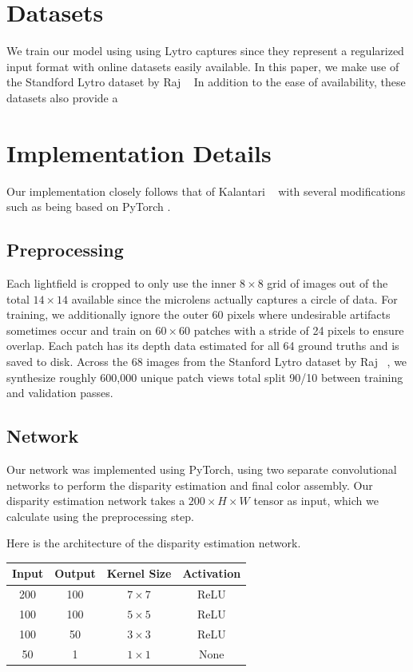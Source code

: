\documentclass[10pt,twocolumn,letterpaper]{article}
\begin{document}
\section{Datasets}

We train our model using using Lytro captures since they represent a regularized input format with
online datasets easily available. In this paper, we make use of the Standford Lytro dataset by Raj \etal~\cite{StanfordLytro}
In addition to the ease of availability, these datasets also provide a 

\section{Implementation Details}

Our implementation closely follows that of Kalantari \etal~\cite{LearningViewSynthesis} with several modifications such
as being based on PyTorch \cite{PyTorch}.

\subsection{Preprocessing}

Each lightfield is cropped to only use the inner $8 \times 8$ grid of images out of the total $14 \times 14$ available
since the microlens actually captures a circle of data. For training, we additionally ignore the outer 60 pixels where
undesirable artifacts sometimes occur and train on $60\times60$ patches with a stride of 24 pixels to ensure overlap.
Each patch has its depth data estimated for all 64 ground truths and is saved to disk. Across the 68 images from the
Stanford Lytro dataset by Raj \etal~\cite{StanfordLytro}, we synthesize roughly 600,000 unique patch views total split
90/10 between training and validation passes.

\subsection{Network}

Our network was implemented using PyTorch, using two separate convolutional networks to perform the
disparity estimation and final color assembly. Our disparity estimation network takes a 
$200 \times H \times W$ tensor as input, which we calculate using the preprocessing step.

Here is the architecture of the disparity estimation network.

\begin{center}
\begin{tabular}{|c c c c|}
    \hline
    Input & Output & Kernel Size & Activation \\
    \hline
    200 & 100 & $7 \times 7$ & ReLU \\
    100 & 100 & $5 \times 5$ & ReLU \\
    100 & 50 & $3 \times 3$ & ReLU \\
    50 & 1 & $1 \times 1$ & None \\
    \hline
\end{tabular}
\end{center}
\end{document}
